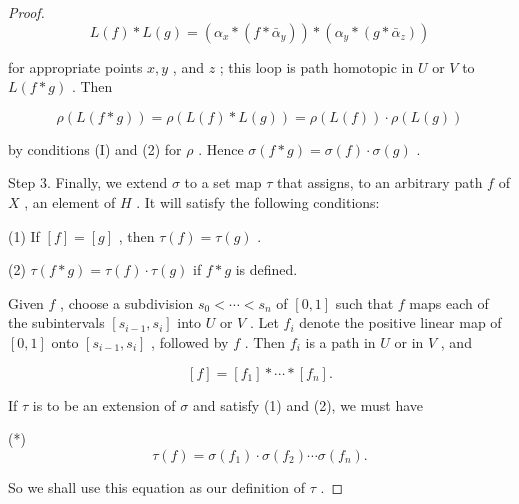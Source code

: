 \begin{proof}
\[
L\left( f\right)  * L\left( g\right)  = \left( {{\alpha }_{x} * \left( {f * {\bar{\alpha }}_{y}}\right) }\right)  * \left( {{\alpha }_{y} * \left( {g * {\bar{\alpha }}_{z}}\right) }\right)
\]

for appropriate points \(x,y\) , and \(z\) ; this loop is path homotopic in \(U\) or \(V\) to \(L\left( {f * g}\right)\) . Then

\[
\rho \left( {L\left( {f * g}\right) }\right)  = \rho \left( {L\left( f\right)  * L\left( g\right) }\right)  = \rho \left( {L\left( f\right) }\right)  \cdot  \rho \left( {L\left( g\right) }\right)
\]

by conditions (I) and (2) for \(\rho\) . Hence \(\sigma \left( {f * g}\right)  = \sigma \left( f\right)  \cdot  \sigma \left( g\right)\) .

Step 3. Finally, we extend \(\sigma\) to a set map \(\tau\) that assigns, to an arbitrary path \(f\) of \(X\) , an element of \(H\) . It will satisfy the following conditions:

(1) If \(\left\lbrack  f\right\rbrack = \left\lbrack  g\right\rbrack\) , then \(\tau \left( f\right)  = \tau \left( g\right)\) .

(2) \(\tau \left( {f * g}\right)  = \tau \left( f\right)  \cdot  \tau \left( g\right)\) if \(f * g\) is defined.

Given \(f\) , choose a subdivision \({s}_{0} < \cdots  < {s}_{n}\) of \(\left\lbrack  {0,1}\right\rbrack\) such that \(f\) maps each of the subintervals \(\left\lbrack  {{s}_{i - 1},{s}_{i}}\right\rbrack\) into \(U\) or \(V\) . Let \({f}_{i}\) denote the positive linear map of \(\left\lbrack  {0,1}\right\rbrack\) onto \(\left\lbrack  {{s}_{i - 1},{s}_{i}}\right\rbrack\) , followed by \(f\) . Then \({f}_{i}\) is a path in \(U\) or in \(V\) , and

\[
\left\lbrack  f\right\rbrack = \left\lbrack  {f}_{1}\right\rbrack * \cdots  * \left\lbrack  {f}_{n}\right\rbrack  .
\]

If \(\tau\) is to be an extension of \(\sigma\) and satisfy (1) and (2), we must have

(*)
\[
\tau \left( f\right)  = \sigma \left( {f}_{1}\right)  \cdot  \sigma \left( {f}_{2}\right) \cdots \sigma \left( {f}_{n}\right) .
\]

So we shall use this equation as our definition of \(\tau\) .


\end{proof}
